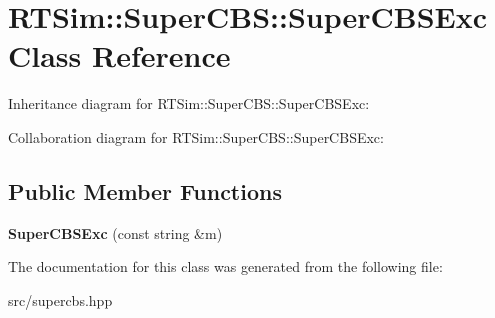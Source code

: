 \hypertarget{classRTSim_1_1SuperCBS_1_1SuperCBSExc}{}\section{R\+T\+Sim\+:\+:Super\+C\+BS\+:\+:Super\+C\+B\+S\+Exc Class Reference}
\label{classRTSim_1_1SuperCBS_1_1SuperCBSExc}


Inheritance diagram for R\+T\+Sim\+:\+:Super\+C\+BS\+:\+:Super\+C\+B\+S\+Exc\+:


Collaboration diagram for R\+T\+Sim\+:\+:Super\+C\+BS\+:\+:Super\+C\+B\+S\+Exc\+:
\subsection*{Public Member Functions}
\begin{DoxyCompactItemize}
\item 
{\bfseries Super\+C\+B\+S\+Exc} (const string \&m)\hypertarget{classRTSim_1_1SuperCBS_1_1SuperCBSExc_a3767ec0109b20613fc940cc8562426e3}{}\label{classRTSim_1_1SuperCBS_1_1SuperCBSExc_a3767ec0109b20613fc940cc8562426e3}

\end{DoxyCompactItemize}


The documentation for this class was generated from the following file\+:\begin{DoxyCompactItemize}
\item 
src/supercbs.\+hpp\end{DoxyCompactItemize}
